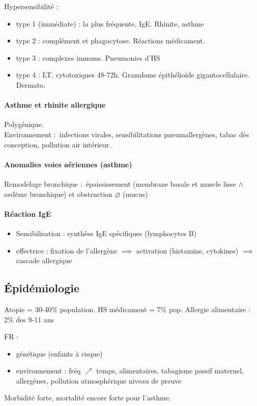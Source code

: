 Hypersensibilité :
\begin{itemize}
  \item type 1 (immédiate) : la plus fréquente, IgE. Rhinite, asthme
  \item type 2 : complément et phagocytose. Réactions médicament.
  \item type 3 : complexes immuns. Pneumonies d'HS
  \item type 4 : LT, cytotoxiques 48-72h. Granulome épithélioïde gigantocellulaire.
    Dermato.
\end{itemize}

\paragraph{Asthme et rhinite allergique}
Polygénique.\\
Environnement : infections virales, sensibilitations pneumallergènes, tabac dès
conception, pollution air intérieur. 

\paragraph{Anomalies voies aériennes (asthme)}
Remodelage bronchique : épaississement (membrane basale et muscle lisse $\wedge$ oedème
bronchique) et obstruction $\diameter$ (mucus)

\paragraph{Réaction IgE}
\begin{itemize}
  \item Sensibilisation : synthèse IgE spécifiques (lymphocytes B)
  \item effectrice : fixation de l'allergène $\implies$ activation (histamine,
    cytokines) $\implies$ cascade allergique
\end{itemize}

\subsection{Épidémiologie}
Atopie = 30-40\% population. HS médicament = 7\% pop. Allergie alimentaire : 2\%
des 9-11 ans

FR : 
\begin{itemize}
  \item génétique (enfants à risque)
  \item environnement : fréq $\nearrow$ temps, alimentaires, tabagisme passif
    maternel, allergènes, pollution atmosphérique \danger niveau de preuve 
\end{itemize}
Morbidité forte, mortalité encore forte pour l'asthme.

